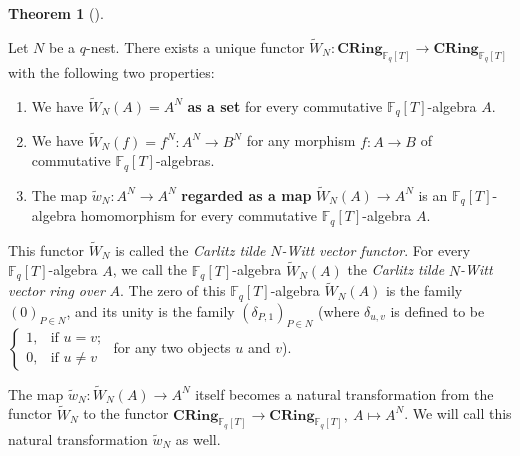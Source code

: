 \documentclass[numbers=enddot,12pt,final,onecolumn,notitlepage]{scrartcl}%
\theoremstyle{definition}
\newtheorem{theo}{Theorem}[section]
\newenvironment{theorem}[1][]
{\begin{theo}[#1]\begin{leftbar}}
{\end{leftbar}\end{theo}}
\begin{document}
\begin{theorem}
\label{thm.carlitz.Witt.class.tilde}Let $N$ be a $q$-nest. There exists a
unique functor $\widetilde{W}_{N}:\mathbf{CRing}_{\mathbb{F}_{q}\left[
T\right]  }\rightarrow\mathbf{CRing}_{\mathbb{F}_{q}\left[  T\right]  }$ with
the following two properties:

\begin{enumerate}
\item We have $\widetilde{W}_{N}\left(  A\right)  =A^{N}$ \textbf{as a set}
for every commutative $\mathbb{F}_{q}\left[  T\right]  $-algebra $A$.

\item We have $\widetilde{W}_{N}\left(  f\right)  =f^{N}:A^{N}\rightarrow
B^{N}$ for any morphism $f:A\rightarrow B$ of commutative $\mathbb{F}%
_{q}\left[  T\right]  $-algebras.

\item The map $\widetilde{w}_{N}:A^{N}\rightarrow A^{N}$ \textbf{regarded as a
map }$\widetilde{W}_{N}\left(  A\right)  \rightarrow A^{N}$ is an
$\mathbb{F}_{q}\left[  T\right]  $-algebra homomorphism for every commutative
$\mathbb{F}_{q}\left[  T\right]  $-algebra $A$.
\end{enumerate}

This functor $\widetilde{W}_{N}$ is called the \textit{Carlitz tilde }%
$N$\textit{-Witt vector functor}. For every $\mathbb{F}_{q}\left[  T\right]
$-algebra $A$, we call the $\mathbb{F}_{q}\left[  T\right]  $-algebra
$\widetilde{W}_{N}\left(  A\right)  $ the \textit{Carlitz tilde }%
$N$\textit{-Witt vector ring over }$A$. The zero of this $\mathbb{F}%
_{q}\left[  T\right]  $-algebra $\widetilde{W}_{N}\left(  A\right)  $ is the
family $\left(  0\right)  _{P\in N}$, and its unity is the family $\left(
\delta_{P,1}\right)  _{P\in N}$ (where $\delta_{u,v}$ is defined to be $%
\begin{cases}
1, & \text{if }u=v;\\
0, & \text{if }u\neq v
\end{cases}
$ for any two objects $u$ and $v$).

The map $\widetilde{w}_{N}:\widetilde{W}_{N}\left(  A\right)  \rightarrow
A^{N}$ itself becomes a natural transformation from the functor $\widetilde{W}%
_{N}$ to the functor $\mathbf{CRing}_{\mathbb{F}_{q}\left[  T\right]
}\rightarrow\mathbf{CRing}_{\mathbb{F}_{q}\left[  T\right]  },\ A\mapsto
A^{N}$. We will call this natural transformation $\widetilde{w}_{N}$ as well.
\end{theorem}
\end{document}
